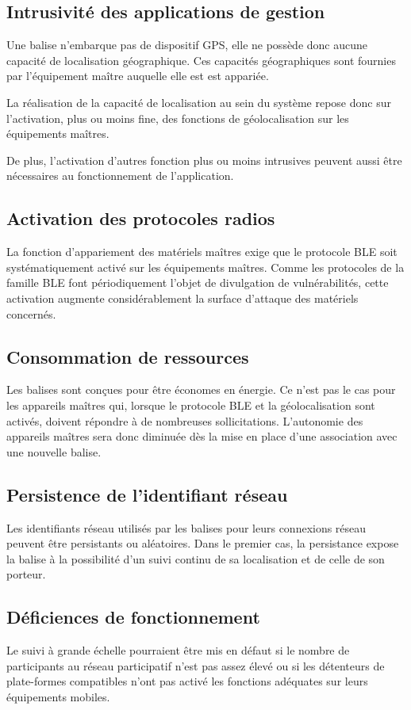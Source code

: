 \documentclass[headings=small,cmyk,french,a4paper,twocolumn,garamond,11pt]{scrartcl}
\begin{document}
\subsection{Intrusivité des applications de gestion}
Une balise n'embarque pas de dispositif GPS, elle ne possède donc
aucune capacité de localisation géographique. Ces capacités
géographiques  sont fournies par l'équipement maître auquelle elle
est est appariée.

La réalisation de la capacité de localisation au sein du système
repose donc sur l'activation, plus ou moins fine, des fonctions de
géolocalisation sur les équipements maîtres.

De plus, l'activation d'autres fonction plus ou moins intrusives
peuvent aussi être nécessaires au fonctionnement de l'application.

\subsection{Activation des protocoles radios}

La fonction d'appariement des matériels maîtres exige que le protocole
\acrshort{BLE} soit systématiquement activé sur les équipements maîtres.
Comme les protocoles de la famille \acrshort{BLE} font périodiquement
l'objet de divulgation de vulnérabilités, cette activation augmente
considérablement la surface d'attaque des matériels concernés.

\subsection{Consommation de ressources}
Les balises sont conçues pour être économes en énergie.  Ce n'est
pas le cas pour les appareils maîtres qui, lorsque le protocole
\acrshort{BLE} et la géolocalisation sont activés, doivent répondre à de
nombreuses sollicitations. L'autonomie des appareils maîtres sera donc
diminuée dès la mise en place d'une association avec une nouvelle
balise.

\subsection{Persistence  de l'identifiant réseau}
Les identifiants réseau utilisés par les balises pour leurs connexions
réseau peuvent être persistants ou aléatoires. Dans le premier cas, la
persistance expose la balise à la possibilité d'un suivi continu de sa
localisation et de celle de son porteur.
\subsection{Déficiences de fonctionnement}
Le suivi à grande échelle pourraient être mis en défaut si le nombre
de participants au réseau participatif n'est pas assez élevé ou si les
détenteurs de plate-formes compatibles n'ont pas activé les fonctions
adéquates sur leurs équipements mobiles.
\end{document}
